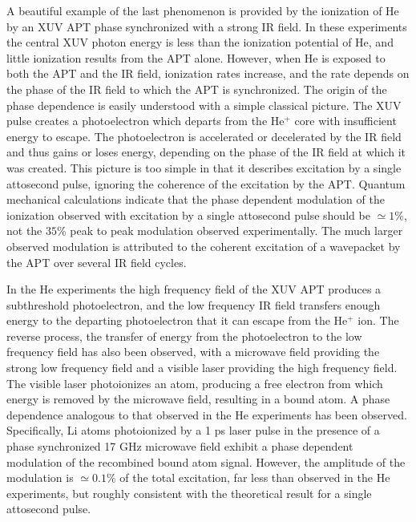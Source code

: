 \documentclass[pra, reprint]{revtex4-1}
\begin{document}
A beautiful example of the last phenomenon is provided by the ionization of He by an XUV APT phase synchronized with a strong IR field\cite{Ranitovich_2010,Johnsson_2005}. In these experiments the central XUV photon energy is less than the ionization potential of He, and little ionization results from the APT alone. However, when He is exposed to both the APT and the IR field, ionization rates increase, and the rate depends on the phase of the IR field to which the APT is synchronized. The origin of the phase dependence is easily understood with a simple classical picture. The XUV pulse creates a photoelectron which departs from the He$^+$ core with insufficient energy to escape. The photoelectron is accelerated or decelerated by the IR field and thus gains or loses energy, depending on the phase of the IR field at which it was created. This picture is too simple in that it describes excitation by a single attosecond pulse, ignoring the coherence of the excitation by the APT\cite{Johnsson_2005}. Quantum mechanical calculations indicate that the phase dependent modulation of the ionization observed with excitation by a single attosecond pulse should be $\simeq 1\%$, not the $35\%$ peak to peak modulation observed experimentally\cite{Johnsson_2005,Tong_2010}. The much larger observed modulation is attributed to the coherent excitation of a wavepacket by the APT over several IR field cycles.

In the He experiments the high frequency field of the XUV APT produces a subthreshold photoelectron, and the low frequency IR field transfers enough energy to the departing photoelectron that it can escape from the He$^+$ ion. The reverse process, the transfer of energy from the photoelectron to the low frequency field has also been observed, with a microwave field providing the strong low frequency field and a visible laser providing the high frequency field\cite{Shuman_2008,Overstreet_2011}. The visible laser photoionizes an atom, producing a free electron from which energy is removed by the microwave field, resulting in a bound atom\cite{Shuman_2008}. A phase dependence analogous to that observed in the He experiments has been observed. Specifically, Li atoms photoionized by a 1 ps laser pulse in the presence of a phase synchronized 17 GHz microwave field exhibit a phase dependent modulation of the recombined bound atom signal\cite{Overstreet_2011}. However, the amplitude of the modulation is $\simeq 0.1\%$ of the total excitation, far less than observed in the He experiments, but roughly consistent with the theoretical result for a single attosecond pulse\cite{Johnsson_2005}.
\end{document}
